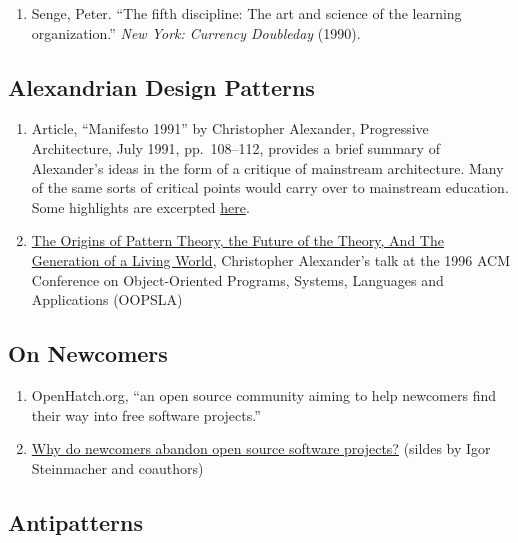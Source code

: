 \begin{enumerate}
\def\labelenumi{\arabic{enumi}.}
\itemsep1pt\parskip0pt
\item
  Senge, Peter. ``The fifth discipline: The art and science of the
  learning organization.'' \emph{New York: Currency Doubleday} (1990).
\end{enumerate}

\subsection{Alexandrian Design
Patterns}\label{rec:alexandrian-design-patterns}

\begin{enumerate}
\def\labelenumi{\arabic{enumi}.}
\item
  Article, ``Manifesto 1991'' by Christopher Alexander, Progressive
  Architecture, July 1991, pp.~108--112, provides a brief summary of
  Alexander's ideas in the form of a critique of mainstream
  architecture. Many of the same sorts of critical points would carry
  over to mainstream education. Some highlights are excerpted
  \href{https://plus.google.com/u/0/108598104736826154120/posts/agWYcqPhqSN}{here}.
\item
  \href{http://www.patternlanguage.com/archive/ieee/ieeetext.htm}{The
  Origins of Pattern Theory, the Future of the Theory, And The
  Generation of a Living World}, Christopher Alexander's talk at the
  1996 ACM Conference on Object-Oriented Programs, Systems, Languages
  and Applications (OOPSLA)
\end{enumerate}

\subsection{On Newcomers}\label{rec:on-newcomers}

\begin{enumerate}
\def\labelenumi{\arabic{enumi}.}
\item
  OpenHatch.org, ``an open source community aiming to help newcomers
  find their way into free software projects.''
\item
  \href{http://lapessc.ime.usp.br/public/papers/13872/CHASE13_present.pdf}{Why
  do newcomers abandon open source software projects?} (sildes by Igor
  Steinmacher and coauthors)
\end{enumerate}

\subsection{Antipatterns}\label{rec:antipatterns}

